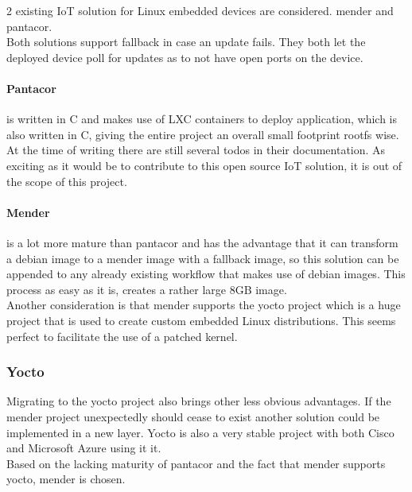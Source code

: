 \documentclass[../../main.tex]{subfiles}
\begin{document}
2 existing IoT solution for Linux embedded devices are considered.
mender\cite{mender-home} and pantacor\cite{panatahub}.\\

Both solutions support fallback in case an update fails.
They both let the deployed device poll for updates as to not have open ports on the device.

\paragraph{Pantacor}%
\label{par:pantacor}

is written in C and makes use of LXC containers to deploy application, which is also written in C,
giving the entire project an overall small footprint rootfs wise.\\
At the time of writing there are still several todos in their documentation. As exciting as it
would be to contribute to this open source IoT solution, it is out of the scope of this project.


\paragraph{Mender}%
\label{par:mender}

is a lot more mature than pantacor and has the advantage that it can transform a debian image
to a mender image with a fallback image, so this solution can be appended to any already 
existing workflow that makes use of debian images. This process as easy as it is, creates a
rather large 8GB image.\\

Another consideration is that mender supports the yocto project which is a huge project that is
used to create custom embedded Linux distributions. This seems perfect to facilitate the use of
a patched kernel.\\

\subsubsection{Yocto}%
\label{ssub:yocto}

Migrating to the yocto project also brings other less obvious advantages.
If the mender project unexpectedly should cease to exist another solution could
be implemented in a new layer.
Yocto is also a very stable project with both Cisco and Microsoft Azure using it it.
\\


Based on the lacking maturity of pantacor and the fact that mender supports yocto, mender is
chosen.
\end{document}
